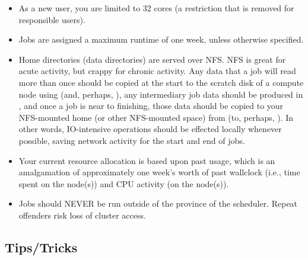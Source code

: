 \documentclass{easychair}
\begin{document}
\begin{itemize}
\item
As a new user, you are limited to 32 cores (a restriction that is removed for responsible users).

\item
Jobs are assigned a maximum runtime of one week, unless otherwise specified. 

\item
Home directories (data directories) are served over NFS. NFS is great for 
acute activity, but crappy for chronic activity. Any data that a job will 
read more than once should be copied at the start to the scratch disk of a 
compute node using  (and, perhaps, ), 
any intermediary job data should be produced in , and once a 
job is near to finishing, those data should be copied to your NFS-mounted 
home (or other NFS-mounted space) from  (to, perhaps,
). In other words, IO-intensive operations should be effected 
locally whenever possible, saving network activity for the start and end of 
jobs. 

\item
Your current resource allocation is based upon past usage, which is an 
amalgamation of approximately one week's worth of past wallclock (i.e., time 
spent on the node(s)) and CPU activity (on the node(s)).

\item
Jobs should NEVER be run outside of the province of the scheduler. Repeat offenders risk loss of cluster access. 
\end{itemize}

\subsection{Tips/Tricks}
\end{document}
